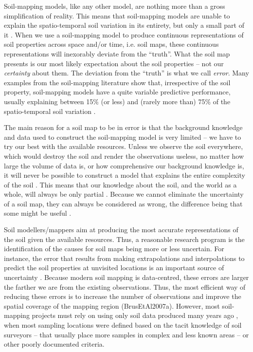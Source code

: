 Soil-mapping models, like any other model, are nothing more than a gross simplification of reality.
This means that soil-mapping models are unable to explain the spatio-temporal soil variation in 
its entirety, but only a small part of it \citep{Heuvelink1998a}. When we use a soil-mapping model
to produce continuous representations of soil properties across space and/or time, i.e. soil
maps, these continuous representations will inexorably deviate from the ``truth''. What the soil map
presents is our most likely expectation about the soil properties -- not our \textit{certainty}
about them. The deviation from the ``truth'' is what we call \textit{error}. Many examples from the 
soil-mapping literature show that, irrespective of the soil property, soil-mapping models have a 
quite variable predictive performance, usually explaining between 15\% (or less) and (rarely more 
than) 75\% of the spatio-temporal soil variation \citep{MooreEtAl1993, OdehEtAl1994, GesslerEtAl1995, 
McKenzieEtAl1999, GobinEtAl2001, SumflethEtAl2008, SunEtAl2012, ViscarraRosselEtAl2013, 
NussbaumEtAl2014, HenglEtAl2015, GaschEtAl2015, HeungEtAl2016}.

The main reason for a soil map to be in error is that the background knowledge and data used to 
construct the soil-mapping model is very limited -- we have to try our best with the available 
resources. Unless we observe the soil everywhere, which would destroy the soil and render the 
observations useless, no matter how large the volume of data is, or how comprehensive our background
knowledge is, it will never be possible to construct a model that explains the entire complexity of 
the soil \citep{Tukey1997}. This means that our knowledge about the soil, and the world as a whole, 
will always be only partial \citep{Box1993}. Because we cannot eliminate the uncertainty of a soil 
map, they can always be considered as wrong, the difference being that some might be useful 
\citep{Box1976}.

Soil modellers/mappers aim at producing the most accurate representations of the soil given the 
available resources. Thus, a reasonable research program is the identification of the causes for 
soil maps being more or less uncertain. For instance, the error that results from making 
extrapolations and interpolations to predict the soil properties at unvisited locations is an 
important source of uncertainty \citep{HeuvelinkEtAl1999, RefsgaardEtAl2006}. Because modern soil 
mapping is data-centred, these errors are larger the farther we are from the existing 
observations. Thus, the most efficient way of reducing these errors is to increase the number of 
observations and improve the spatial coverage of the mapping region (BrusEtAl2007a). However, most 
soil-mapping projects must rely on using only soil data produced many years ago \citep{KempenEtAl2009, 
HenglEtAl2014, PoggioEtAl2014, NussbaumEtAl2014, MulderEtAl2016}, when most sampling locations were 
defined based on the tacit knowledge of soil surveyors -- that usually place more samples in complex 
and less known areas \citep{Rossiter2000} -- or other poorly documented criteria.

